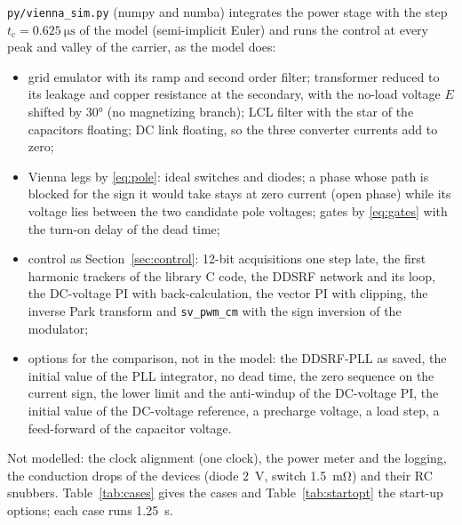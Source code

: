 \documentclass[11pt,a4paper]{scrartcl}
\newcommand{\ped}[1]{_{\mathrm{#1}}}
\newcommand{\code}[1]{\texttt{#1}}
\begin{document}
\begin{onehalfspace}
\code{py/vienna\_sim.py} (numpy and numba) integrates the power stage with the step $t\ped{c} = \SI{0.625}{\micro\second}$ of the model (semi-implicit Euler) and runs the control at every peak and valley of the carrier, as the model does:
\begin{itemize}[nosep]
	\item grid emulator with its ramp and second order filter; transformer reduced to its leakage and copper resistance at the secondary, with the no-load voltage $E$ shifted by \ang{30} (no magnetizing branch); LCL filter with the star of the capacitors floating; DC link floating, so the three converter currents add to zero;
	\item Vienna legs by \eqref{eq:pole}: ideal switches and diodes; a phase whose path is blocked for the sign it would take stays at zero current (open phase) while its voltage lies between the two candidate pole voltages; gates by \eqref{eq:gates} with the turn-on delay of the dead time;
	\item control as Section~\ref{sec:control}: 12-bit acquisitions one step late, the first harmonic trackers of the library C code, the DDSRF network and its loop, the DC-voltage PI with back-calculation, the vector PI with clipping, the inverse Park transform and \code{sv\_pwm\_cm} with the sign inversion of the modulator;
	\item options for the comparison, not in the model: the DDSRF-PLL as saved, the initial value of the PLL integrator, no dead time, the zero sequence on the current sign, the lower limit and the anti-windup of the DC-voltage PI, the initial value of the DC-voltage reference, a precharge voltage, a load step, a feed-forward of the capacitor voltage.
\end{itemize}
Not modelled: the clock alignment (one clock), the power meter and the logging, the conduction drops of the devices (diode \SI{2}{\volt}, switch \SI{1.5}{\milli\ohm}) and their RC snubbers. Table~\ref{tab:cases} gives the cases and Table~\ref{tab:startopt} the start-up options; each case runs \SI{1.25}{\second}.


\end{onehalfspace}
\end{document}
